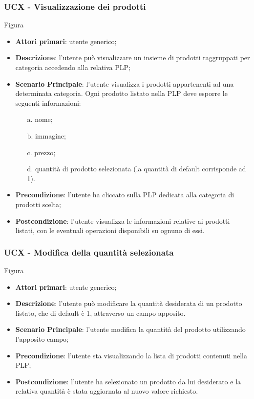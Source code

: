 \subsubsection{UCX - Visualizzazione dei prodotti}
Figura \\
\begin{itemize}
\item \textbf{Attori primari}: utente generico;
\item \textbf{Descrizione}: l'utente può visualizzare un insieme di prodotti raggruppati per categoria accedendo alla relativa PLP;
\item \textbf{Scenario Principale}: l'utente visualizza i prodotti appartenenti ad una determinata categoria. Ogni prodotto listato nella PLP deve esporre le seguenti informazioni:
\begin{enumerate}
\item[a.] nome;
\item[b.] immagine;
\item[c.] prezzo;
\item[d.] quantità di prodotto selezionata (la quantità di default corrisponde ad 1).
\end{enumerate}
\item \textbf{Precondizione}: l'utente ha cliccato sulla PLP dedicata alla categoria di prodotti scelta;
\item \textbf{Postcondizione}: l'utente visualizza le informazioni relative ai prodotti listati, con le eventuali operazioni disponibili su ognuno di essi.
\end{itemize}
\subsubsection{UCX - Modifica della quantità selezionata}
Figura \\
\begin{itemize}
\item \textbf{Attori primari}: utente generico;
\item \textbf{Descrizione}: l'utente può modificare la quantità desiderata di un prodotto listato, che di default è 1, attraverso un campo apposito.
\item \textbf{Scenario Principale}: l'utente modifica la quantità del prodotto utilizzando l'apposito campo;
\item \textbf{Precondizione}: l'utente sta visualizzando la lista di prodotti contenuti nella PLP;
\item \textbf{Postcondizione}: l'utente ha selezionato un prodotto da lui desiderato e la relativa quantità è stata aggiornata al nuovo valore richiesto.
\end{itemize}
